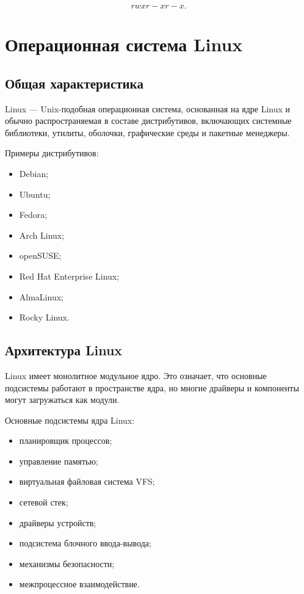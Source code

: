 \documentclass[12pt,a4paper]{article}
\begin{document}
\[
rwxr-xr-x.
\]

\section{Операционная система Linux}

\subsection{Общая характеристика}

Linux --- Unix-подобная операционная система, основанная на ядре Linux и обычно распространяемая в составе дистрибутивов, включающих системные библиотеки, утилиты, оболочки, графические среды и пакетные менеджеры.

Примеры дистрибутивов:

\begin{itemize}
    \item Debian;
    \item Ubuntu;
    \item Fedora;
    \item Arch Linux;
    \item openSUSE;
    \item Red Hat Enterprise Linux;
    \item AlmaLinux;
    \item Rocky Linux.
\end{itemize}

\subsection{Архитектура Linux}

Linux имеет монолитное модульное ядро. Это означает, что основные подсистемы работают в пространстве ядра, но многие драйверы и компоненты могут загружаться как модули.

Основные подсистемы ядра Linux:

\begin{itemize}
    \item планировщик процессов;
    \item управление памятью;
    \item виртуальная файловая система VFS;
    \item сетевой стек;
    \item драйверы устройств;
    \item подсистема блочного ввода-вывода;
    \item механизмы безопасности;
    \item межпроцессное взаимодействие.
\end{itemize}
\end{document}
